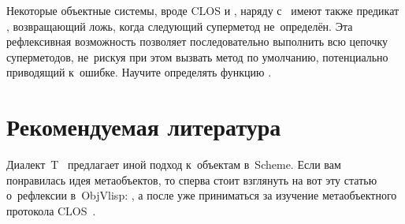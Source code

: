 \begin{exercise}\label{objects/ex:next-method}
Некоторые объектные системы, вроде CLOS и \TELOS, наряду с~
имеют также предикат , возвращающий ложь, когда следующий
суперметод не~определён. Эта рефлексивная возможность позволяет последовательно
выполнить всю цепочку суперметодов, не~рискуя при этом вызвать метод по
умолчанию, потенциально приводящий к~ошибке. Научите 
определять функцию .
\end{exercise}


\section*{Рекомендуемая литература}\label{objects/sect:recommended-reading}

Диалект~T~\cite{ar88} предлагает иной подход к~объектам в~Scheme. Если вам
понравилась идея метаобъектов, то сперва стоит взглянуть на вот эту статью
о~рефлексии в~ObjVlisp: \cite{coi87}, а после уже приниматься за изучение
метаобъектного протокола CLOS~\cite{kdrb92}.
